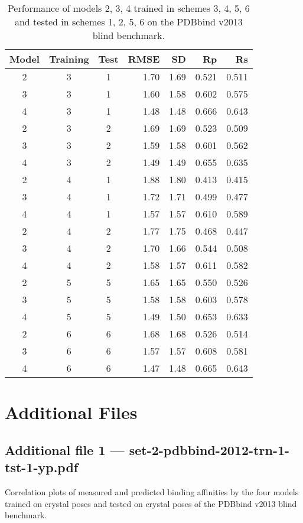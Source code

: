 \documentclass[twocolumn]{bmcart}
\begin{document}
\begin{backmatter}
\begin{table}[ht]
\caption{Performance of models 2, 3, 4 trained in schemes 3, 4, 5, 6 and tested in schemes 1, 2, 5, 6 on the PDBbind v2013 blind benchmark.}
\label{rescoring2:set-2-pdbbind-2012-trn-3456-tst-1256-raw}
\begin{tabular}{cccrrrr}
\hline
Model & Training & Test & RMSE & SD & Rp & Rs\\
\hline
2 & 3 & 1 & 1.70 & 1.69 & 0.521 & 0.511\\
3 & 3 & 1 & 1.60 & 1.58 & 0.602 & 0.575\\
4 & 3 & 1 & 1.48 & 1.48 & 0.666 & 0.643\\
\hline
2 & 3 & 2 & 1.69 & 1.69 & 0.523 & 0.509\\
3 & 3 & 2 & 1.59 & 1.58 & 0.601 & 0.562\\
4 & 3 & 2 & 1.49 & 1.49 & 0.655 & 0.635\\
\hline
2 & 4 & 1 & 1.88 & 1.80 & 0.413 & 0.415\\
3 & 4 & 1 & 1.72 & 1.71 & 0.499 & 0.477\\
4 & 4 & 1 & 1.57 & 1.57 & 0.610 & 0.589\\
\hline
2 & 4 & 2 & 1.77 & 1.75 & 0.468 & 0.447\\
3 & 4 & 2 & 1.70 & 1.66 & 0.544 & 0.508\\
4 & 4 & 2 & 1.58 & 1.57 & 0.611 & 0.582\\
\hline
2 & 5 & 5 & 1.65 & 1.65 & 0.550 & 0.526\\
3 & 5 & 5 & 1.58 & 1.58 & 0.603 & 0.578\\
4 & 5 & 5 & 1.49 & 1.50 & 0.653 & 0.633\\
\hline
2 & 6 & 6 & 1.68 & 1.68 & 0.526 & 0.514\\
3 & 6 & 6 & 1.57 & 1.57 & 0.608 & 0.581\\
4 & 6 & 6 & 1.47 & 1.48 & 0.665 & 0.643\\
\hline
\end{tabular}
\end{table}


\section*{Additional Files}

\subsection*{Additional file 1 --- set-2-pdbbind-2012-trn-1-tst-1-yp.pdf}
Correlation plots of measured and predicted binding affinities by the four models trained on crystal poses and tested on crystal poses of the PDBbind v2013 blind benchmark.


\end{backmatter}
\end{document}
